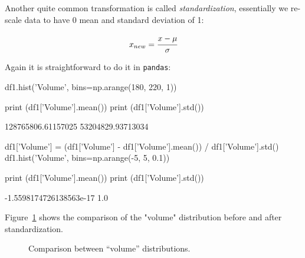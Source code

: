 Another quite common transformation is called \emph{standardization}, essentially we re-scale data to have 0 mean and standard deviation of 1:

\begin{equation}
x_{new} = \cfrac{x-\mu}{\sigma}
\label{eq:standardization}
\end{equation}

Again it is straightforward to do it in \texttt{pandas}:

\begin{ipythonnon}
df1.hist('Volume', bins=np.arange(180, 220, 1))

print (df1['Volume'].mean())
print (df1['Volume'].std())
\end{ipythonnon}
\begin{ioutput}
128765806.61157025
53204829.93713034
\end{ioutput}

\begin{ipythonnon}
df1['Volume'] = (df1['Volume'] - df1['Volume'].mean()) / df1['Volume'].std()
df1.hist('Volume', bins=np.arange(-5, 5, 0.1))

print (df1['Volume'].mean())
print (df1['Volume'].std())
\end{ipythonnon}
\begin{ioutput}
-1.5598174726138563e-17
1.0
\end{ioutput}

Figure~\ref{fig:standardization} shows the comparison of the "volume" distribution before and after standardization.

\begin{figure}[htb]
	\centering
	\caption{Comparison between ``volume'' distributions.}
	\label{fig:standardization}
\end{figure}

